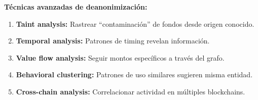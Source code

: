 \documentclass[11pt,a4paper,twoside]{book}
\begin{document}
\begin{remark}
\textbf{T\'ecnicas avanzadas de deanonimizaci\'on:}

\begin{enumerate}
    \item \textbf{Taint analysis:} Rastrear ``contaminaci\'on'' de fondos desde origen conocido.
    
    \item \textbf{Temporal analysis:} Patrones de timing revelan informaci\'on.
    
    \item \textbf{Value flow analysis:} Seguir montos espec\'ificos a trav\'es del grafo.
    
    \item \textbf{Behavioral clustering:} Patrones de uso similares sugieren misma entidad.
    
    \item \textbf{Cross-chain analysis:} Correlacionar actividad en m\'ultiples blockchains.
\end{enumerate}
\end{remark}
\end{document}
